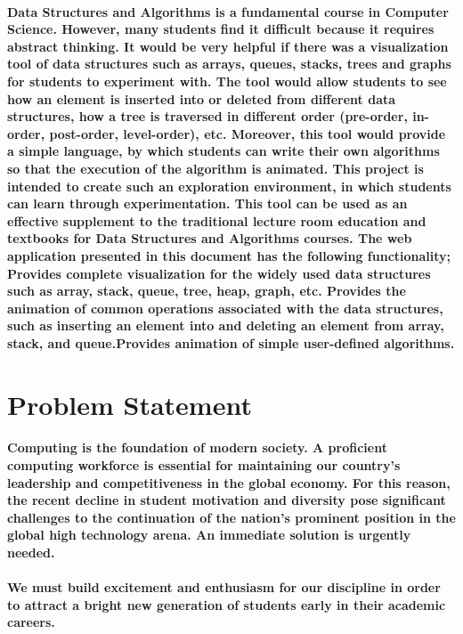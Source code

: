 \documentclass{article}
\begin{document}
\paragraph{Data Structures and Algorithms is a fundamental course in Computer Science\cite{russell2016artificial}. However, many students find it difficult because it requires abstract thinking. It would be very helpful if there was a visualization tool of data structures such as arrays, queues, stacks, trees and graphs for students to experiment with. The tool would allow students to see how an element is inserted into or deleted from different data structures, how a tree is traversed in different order (pre-order, in-order, post-order, level-order), etc. Moreover, this tool would provide a simple language, by which students can write their own algorithms so that the execution of the algorithm is animated. This project is intended to create such an exploration environment, in which students can learn through experimentation. This tool can be used as an effective supplement to the traditional lecture room education and textbooks for Data Structures and Algorithms courses. The web application presented in this document has the following functionality; Provides complete visualization for the widely used data structures such as array, stack, queue, tree, heap, graph, etc\cite{hendrix2004extensible}. Provides the animation of common operations associated with the data structures, such as inserting an element into and deleting an element from array, stack, and queue.Provides animation of simple user-defined algorithms.}




\newpage
\section{Problem Statement}
\paragraph{Computing is the foundation of modern society. A proficient computing workforce is essential for maintaining our country's leadership and competitiveness in the global economy. For this reason, the recent decline in student motivation and diversity pose significant challenges to the continuation of the nation's prominent position in the global high technology arena. An immediate solution is urgently needed.}
\paragraph{We must build excitement and enthusiasm for our discipline in order to attract a bright new generation of students early in their academic careers.}
\end{document}
